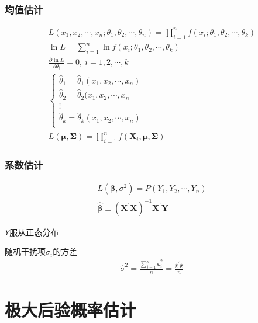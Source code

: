 \documentclass[12pt]{book}
\begin{document}
\subsubsection{均值估计}

\begin{gather*}
    L\left(x_1,x_2,\cdots,x_n;\theta_1,\theta_2,\cdots,\theta_n\right) =\prod_{i=1}^{n}f\left(x_i;\theta_1,\theta_2,\cdots,\theta_k\right)\\
    \ln{L=\sum_{i=1}^{n}} \ln{f\left(x_i;\theta_1,\theta_2,\cdots,\theta_k\right)}\\
    \frac{\partial \ln{L}}{\partial\theta_i}=0,\ i=1,2,\cdots,k\\
    \begin{cases}
        \hat{\theta}_1 = \hat{\theta}_1(x_1,x_2,\cdots,x_n) \\
        \hat{\theta}_2 = \hat{\theta}_2(x_1,x_2,\cdots,x_n  \\
        \vdots                                              \\
        \hat{\theta}_k = \hat{\theta}_k(x_1,x_2,\cdots,x_n) \\
    \end{cases}	\\
    L\left(\bm{\mu},\bm{\Sigma}\right) =\prod_{i=1}^{n}{f(\bm{X}_i,\bm{\mu},\bm{\Sigma})}
\end{gather*}


\subsubsection{系数估计}

\begin{gather*}
    L\left(\bm{\beta},\sigma^2\right) 	=P\left(Y_1,Y_2,\cdots,Y_n\right) \\
    \hat{\bm{\beta}} 	\equiv \left(\bm{X}^\prime\bm{X}\right)^{-1}\bm{X}^\prime\bm{Y}
\end{gather*}


$Y$服从正态分布

随机干扰项$\sigma_i$的方差
\begin{gather*}
    {\hat{\sigma}}^2
    =\frac{
    \sum_{i=1}^{n}{
    {\hat{\bm{\varepsilon}}}_i^2}
    }{n}
    =\frac{
        {\hat{\bm{\varepsilon}}}^\prime \hat{\bm{\varepsilon}}
    }{n}
\end{gather*}






\section{极大后验概率估计}
\end{document}

